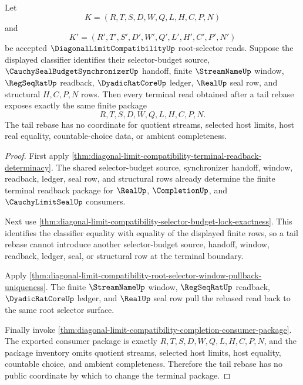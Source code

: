 \begin{theorem}
\label{thm:diagonal-limit-compatibility-terminal-tail-rebase-exactness}
Let
$$
K=(R,T,S,D,W,Q,L,H,C,P,N)
$$
and
$$
K'=(R',T',S',D',W',Q',L',H',C',P',N')
$$
be accepted $\DiagonalLimitCompatibilityUp$ root-selector reads. Suppose the displayed classifier identifies their selector-budget source, $\CauchySealBudgetSynchronizerUp$ handoff, finite $\StreamNameUp$ window, $\RegSeqRatUp$ readback, $\DyadicRatCoreUp$ ledger, $\RealUp$ seal row, and structural $H,C,P,N$ rows. Then every terminal read obtained after a tail rebase exposes exactly the same finite package
$$
R,T,S,D,W,Q,L,H,C,P,N .
$$
The tail rebase has no coordinate for quotient streams, selected host limits, host real equality, countable-choice data, or ambient completeness.
\end{theorem}
\begin{proof}
First apply \autoref{thm:diagonal-limit-compatibility-terminal-readback-determinacy}. The shared selector-budget source, synchronizer handoff, window, readback, ledger, seal row, and structural rows already determine the finite terminal readback package for $\RealUp$, $\CompletionUp$, and $\CauchyLimitSealUp$ consumers.

Next use \autoref{thm:diagonal-limit-compatibility-selector-budget-lock-exactness}. This identifies the classifier equality with equality of the displayed finite rows, so a tail rebase cannot introduce another selector-budget source, handoff, window, readback, ledger, seal, or structural row at the terminal boundary.

Apply \autoref{thm:diagonal-limit-compatibility-root-selector-window-pullback-uniqueness}. The finite $\StreamNameUp$ window, $\RegSeqRatUp$ readback, $\DyadicRatCoreUp$ ledger, and $\RealUp$ seal row pull the rebased read back to the same root selector surface.

Finally invoke \autoref{thm:diagonal-limit-compatibility-completion-consumer-package}. The exported consumer package is exactly $R,T,S,D,W,Q,L,H,C,P,N$, and the package inventory omits quotient streams, selected host limits, host equality, countable choice, and ambient completeness. Therefore the tail rebase has no public coordinate by which to change the terminal package.
\end{proof}

